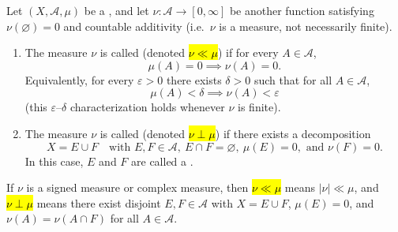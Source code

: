 \begin{definition} \label{definition:absolutely_continuous_and_singular_measures_for_a_measure_on_a_measurable_space}
Let $(X, \mathcal{A}, \mu)$ be a , and let $\nu : \mathcal{A} \to [0, \infty]$ be another function satisfying $\nu(\varnothing) = 0$ and countable additivity (i.e.\ $\nu$ is a measure, not necessarily finite).

\begin{enumerate}
    \item The measure $\nu$ is called  (denoted \hl{$\nu \ll \mu$}) if for every $A \in \mathcal{A}$,
    $$\mu(A) = 0 \implies \nu(A) = 0.$$
    Equivalently, for every $\varepsilon > 0$ there exists $\delta > 0$ such that for all $A \in \mathcal{A}$,
    $$\mu(A) < \delta \implies \nu(A) < \varepsilon$$
    (this $\varepsilon$--$\delta$ characterization holds whenever $\nu$ is finite).

    \item The measure $\nu$ is called  (denoted \hl{$\nu \perp \mu$}) if there exists a decomposition
    $$X = E \cup F \quad \text{with } E, F \in \mathcal{A},\ E \cap F = \varnothing,\ \mu(E) = 0, \text{ and } \nu(F) = 0.$$
    In this case, $E$ and $F$ are called a .
\end{enumerate}


If $\nu$ is a signed measure or complex measure, then \hl{$\nu \ll \mu$} means $|\nu| \ll \mu$, and \hl{$\nu \perp \mu$} means there exist disjoint $E, F \in \mathcal{A}$ with $X = E \cup F$, $\mu(E) = 0$, and $\nu(A) = \nu(A \cap F)$ for all $A \in \mathcal{A}$.
\end{definition}
